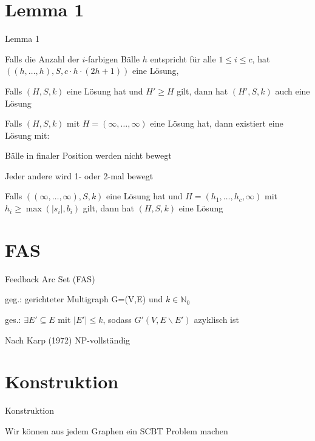\documentclass{beamer}
\begin{document}
\section*{Lemma 1}
\begin{frame}{Lemma 1}
\begin{enumlist}
\item Falls die Anzahl der $i$-farbigen Bälle $h$ entspricht für alle $1 \leq i \leq c$, hat $((h,\dots,h),S,c\cdot h\cdot (2h+1))$ eine Lösung, 
\item Falls $(H,S,k)$ eine Lösung hat und $H' \geq H$ gilt, dann hat $(H',S,k)$ auch eine Lösung
\item Falls $(H,S,k)$ mit $H=(\infty,\dots, \infty)$ eine Lösung hat, dann existiert eine Lösung mit: \begin{pointlist}
\item Bälle in finaler Position werden nicht bewegt
\item Jeder andere wird 1- oder 2-mal bewegt
\end{pointlist}
\item Falls $((\infty, \dots,\infty),S,k)$ eine Lösung hat und $H=( h_1,\dots, h_c, \infty)$ mit $h_i \geq \max(|s_i|,b_i)$ gilt, dann hat $(H,S,k)$ eine Lösung
\end{enumlist}
\end{frame}

\section*{FAS}
\begin{frame}{Feedback Arc Set (FAS)}
\begin{pointlist}
\item geg.: gerichteter Multigraph G=(V,E) und $k\in\mathbb{N}_0$
\item ges.: $\exists E' \subseteq E$ mit $|E'|\leq k$, sodass $G'(V,E\backslash E')$ azyklisch ist
\begin{arrowlist}
\item Nach Karp (1972) NP-vollständig
\end{arrowlist}
\end{pointlist}
\end{frame}

\section*{Konstruktion}
\begin{frame}{Konstruktion}
\begin{pointlist}
\item Wir können aus jedem Graphen ein SCBT Problem machen
\end{pointlist}
\end{frame}
\end{document}
